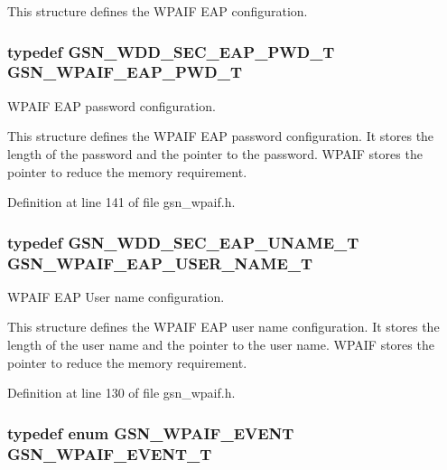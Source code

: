 This structure defines the WPAIF EAP configuration. \hypertarget{a00687_gad6577531dfde003b7207ae0eb46aabee}{
\subsubsection[{GSN\_\-WPAIF\_\-EAP\_\-PWD\_\-T}]{\setlength{\rightskip}{0pt plus 5cm}typedef {\bf GSN\_\-WDD\_\-SEC\_\-EAP\_\-PWD\_\-T} {\bf GSN\_\-WPAIF\_\-EAP\_\-PWD\_\-T}}}
\label{a00687_gad6577531dfde003b7207ae0eb46aabee}


WPAIF EAP password configuration. 

This structure defines the WPAIF EAP password configuration. It stores the length of the password and the pointer to the password. WPAIF stores the pointer to reduce the memory requirement. 

Definition at line 141 of file gsn\_\-wpaif.h.

\hypertarget{a00687_ga0200d673ac133f30a5c4eb16fef8c3a4}{
\subsubsection[{GSN\_\-WPAIF\_\-EAP\_\-USER\_\-NAME\_\-T}]{\setlength{\rightskip}{0pt plus 5cm}typedef {\bf GSN\_\-WDD\_\-SEC\_\-EAP\_\-UNAME\_\-T} {\bf GSN\_\-WPAIF\_\-EAP\_\-USER\_\-NAME\_\-T}}}
\label{a00687_ga0200d673ac133f30a5c4eb16fef8c3a4}


WPAIF EAP User name configuration. 

This structure defines the WPAIF EAP user name configuration. It stores the length of the user name and the pointer to the user name. WPAIF stores the pointer to reduce the memory requirement. 

Definition at line 130 of file gsn\_\-wpaif.h.

\hypertarget{a00687_ga73929543fff4d9b512803f4cb0e94b47}{
\subsubsection[{GSN\_\-WPAIF\_\-EVENT\_\-T}]{\setlength{\rightskip}{0pt plus 5cm}typedef enum {\bf GSN\_\-WPAIF\_\-EVENT} {\bf GSN\_\-WPAIF\_\-EVENT\_\-T}}}
\label{a00687_ga73929543fff4d9b512803f4cb0e94b47}


